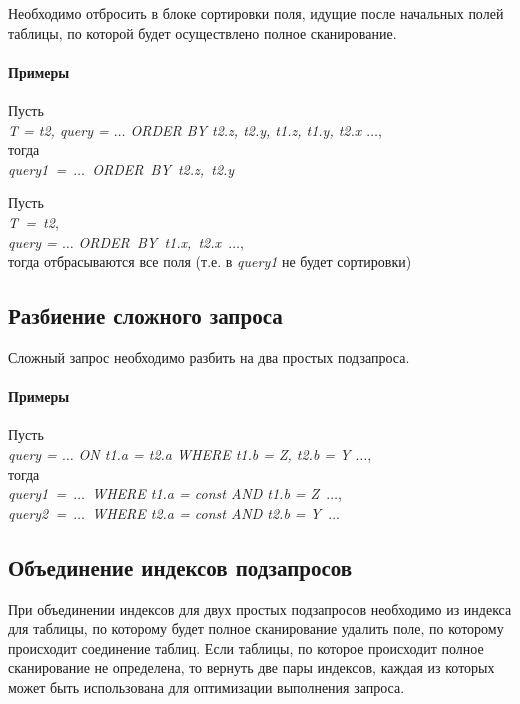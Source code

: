 Необходимо отбросить в блоке сортировки поля, идущие после начальных полей таблицы, по которой будет осуществлено полное сканирование.

\paragraph{Примеры}

Пусть\\
\textit{T = t2, query = $\ldots$ ORDER BY t2.z, t2.y, t1.z, t1.y, t2.x $\ldots$},\\
тогда \\
\textit{query1 = $\ldots$ ORDER BY t2.z, t2.y}

Пусть \\
\textit{T = t2},\\
\textit{query = $\ldots$ ORDER BY t1.x, t2.x $\ldots$},\\
тогда отбрасываются все поля (т.е. в \textit{query1} не будет сортировки)


\subsection{Разбиение сложного запроса}

Сложный запрос необходимо разбить на два простых подзапроса.

\paragraph{Примеры}

Пусть \\
\textit{query = $\ldots$ ON t1.a = t2.a WHERE t1.b = Z, t2.b = Y $\ldots$},\\
тогда\\
\textit{query1 = $\ldots$ WHERE t1.a = const AND t1.b = Z $\ldots$}, \\
\textit{query2 = $\ldots$ WHERE t2.a = const AND t2.b = Y $\ldots$}





\subsection{Объединение индексов подзапросов}

При объединении индексов для двух простых подзапросов необходимо из индекса для таблицы, по которому будет полное сканирование удалить поле, по которому происходит соединение таблиц. Если таблицы, по которое происходит полное сканирование не определена, то вернуть две пары индексов, каждая из которых может быть использована для оптимизации выполнения запроса.

